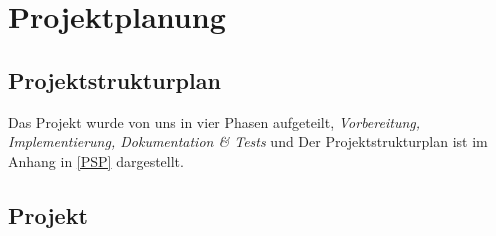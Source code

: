 

\section{Projektplanung}

\subsection{Projektstrukturplan}
Das Projekt wurde von uns in vier Phasen aufgeteilt, \textit{Vorbereitung, Implementierung, Dokumentation & Tests} und 
Der Projektstrukturplan ist im Anhang in \cref{PSP} dargestellt.

\subsection{Projekt}
